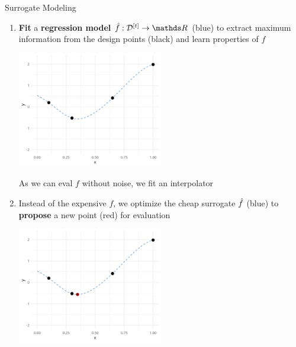 \documentclass[11pt,compress,t,notes=noshow, xcolor=table]{beamer}
\begin{document}
\begin{vbframe}{Surrogate Modeling}
\begin{enumerate}
\item \textbf{Fit} a \textbf{regression model} $\fh: \Dt \rightarrow \R$ (blue) to extract maximum information from the design points (black) and learn properties of $f$
\vspace{+.05cm}

\begin{center}
  \includegraphics[width = 0.5\textwidth]{figure_man/loop_2.png}
\end{center}

\vspace{-.1cm}
As we can eval $f$ without noise, we fit an interpolator

\framebreak 

\item Instead of the expensive $f$, we optimize the cheap 
 surrogate $\hat{f}$ (blue) to \textbf{propose} a new point (red) for evaluation 
\vspace{+.05cm}

\begin{center}
  \includegraphics[width = 0.5\textwidth]{figure_man/loop_3.png}
\end{center}



\end{enumerate}
\end{vbframe}
\end{document}
